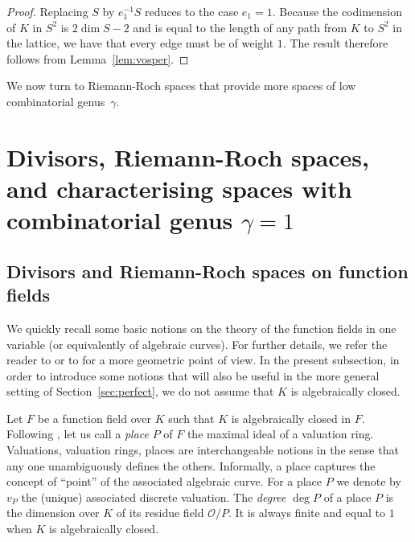 \documentclass{article}
\theoremstyle{plain}
\theoremstyle{definition}
\theoremstyle{remark}
\newtheorem{rema}[thm]{Remark}
\def\Q{{\mathbf Q}}
\def\OO{\mathcal{O}}
\begin{document}
\begin{proof} Replacing $S$ by $e_1^{-1}S$ reduces to the case
  $e_1=1$. Because the
  codimension of $K$ in $S^2$ is $2\dim S-2$ and is equal to the
  length of any path from $K$ to $S^2$ in the lattice, we have that
  every edge must be of weight $1$. The result therefore follows from
  Lemma~\ref{lem:vosper}.
\end{proof}

We now turn to Riemann-Roch spaces that provide more spaces of low
combinatorial genus~$\gamma$. 


\section{Divisors, Riemann-Roch spaces, and characterising spaces with
combinatorial genus $\gamma=1$}
\label{sec:divisors}
\subsection{Divisors and Riemann-Roch spaces on function fields}
\label{subsec:divisors}
We quickly recall some
basic notions on the theory of the function fields in one variable (or
equivalently of algebraic curves).  For further details, we refer the
reader to \cite{Stichtenoth} or to \cite{Fulton} for a more geometric
point of view.
{In the present subsection, 
in order to introduce some
  notions that will also be useful in the more general setting of
  Section~\ref{sec:perfect}, we do not assume that $K$ is algebraically closed.}

Let $F$ be a function
field over $K$ {such that $K$ is algebraically closed
  in $F$}. 
{
Following \cite[Chapter I]{Stichtenoth}, let us call a {\em place} $P$
of
$F$ the maximal ideal of a valuation ring. Valuations, valuation
rings, places are interchangeable notions in the sense that any one
unambiguously defines the others. Informally, a place captures the concept of ``point'' of the associated
algebraic curve. For a place $P$ we denote by $v_P$ the (unique)
associated discrete valuation. The {\em degree} $\deg P$ of a place $P$ is the
dimension over $K$ of its residue field $\OO/P$. It is always finite
and equal to $1$ when $K$ is algebraically closed.
}
\end{document}
